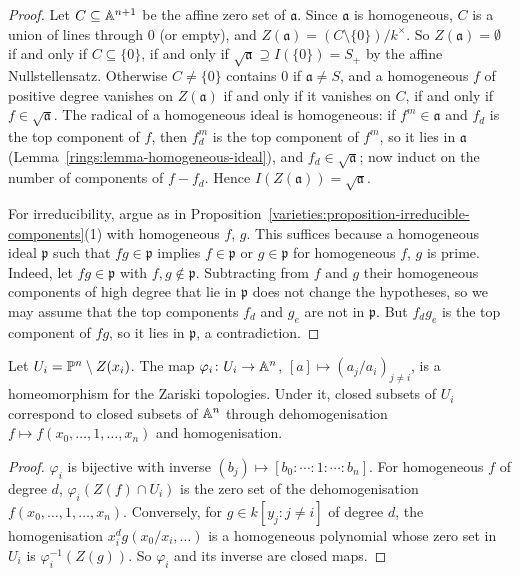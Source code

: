 \begin{proof}
Let $C \subseteq \mathbb{A}^{n+1}$ be the affine zero set of $\mathfrak{a}$. Since $\mathfrak{a}$ is homogeneous, $C$ is a union of lines through $0$ (or
empty), and $Z(\mathfrak{a}) = (C \setminus \{0\})/k^\times$. So $Z(\mathfrak{a}) = \emptyset$ if and only if $C \subseteq \{0\}$, if and only if
$\sqrt{\mathfrak{a}} \supseteq I(\{0\}) = S_+$ by the affine Nullstellensatz. Otherwise $C \neq \{0\}$ contains $0$ if $\mathfrak{a} \neq S$, and a
homogeneous $f$ of positive degree vanishes on $Z(\mathfrak{a})$ if and only if it vanishes on $C$, if and only if $f \in \sqrt{\mathfrak{a}}$. The
radical of a homogeneous ideal is homogeneous: if $f^m \in \mathfrak{a}$ and $f_d$ is the top component of $f$, then $f_d^m$ is the top component of
$f^m$, so it lies in $\mathfrak{a}$ (Lemma~\ref{rings:lemma-homogeneous-ideal}), and $f_d \in \sqrt{\mathfrak{a}}$; now induct on the number of
components of $f - f_d$. Hence $I(Z(\mathfrak{a})) = \sqrt{\mathfrak{a}}$.

For irreducibility, argue as in Proposition~\ref{varieties:proposition-irreducible-components}(1) with homogeneous $f$, $g$. This suffices
because a homogeneous ideal $\mathfrak{p}$ such that $fg \in \mathfrak{p}$ implies $f \in \mathfrak{p}$ or $g \in \mathfrak{p}$ for homogeneous $f$, $g$
is prime. Indeed, let $fg \in \mathfrak{p}$ with $f, g \notin \mathfrak{p}$. Subtracting from $f$ and $g$ their homogeneous components of high
degree that lie in $\mathfrak{p}$ does not change the hypotheses, so we may assume that the top components $f_d$ and $g_e$ are not in
$\mathfrak{p}$. But $f_dg_e$ is the top component of $fg$, so it lies in $\mathfrak{p}$, a contradiction.
\end{proof}

\begin{proposition}\label{varieties:proposition-standard-cover}
Let $U_i = \mathbb{P}^n \setminus Z(x_i)$. The map $\varphi_i \colon U_i \to \mathbb{A}^n$, $[a] \mapsto (a_j/a_i)_{j \neq i}$, is a homeomorphism for the Zariski
topologies. Under it, closed subsets of $U_i$ correspond to closed subsets of $\mathbb{A}^n$ through dehomogenisation
$f \mapsto f(x_0, \ldots, 1, \ldots, x_n)$ and homogenisation.
\end{proposition}

\begin{proof}
$\varphi_i$ is bijective with inverse $(b_j) \mapsto [b_0 : \cdots : 1 : \cdots : b_n]$. For homogeneous $f$ of degree $d$, $\varphi_i(Z(f) \cap U_i)$ is
the zero set of the dehomogenisation $f(x_0, \ldots, 1, \ldots, x_n)$. Conversely, for $g \in k[y_j : j \neq i]$ of degree $d$, the homogenisation
$x_i^dg(x_0/x_i, \ldots)$ is a homogeneous polynomial whose zero set in $U_i$ is $\varphi_i^{-1}(Z(g))$. So $\varphi_i$ and its inverse are closed maps.
\end{proof}

